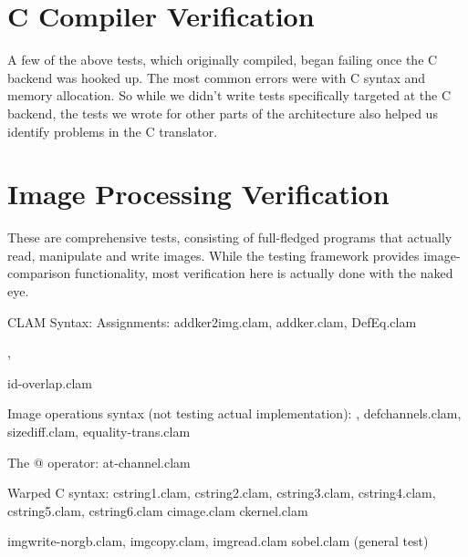 \section{C Compiler Verification}
\label{test:ccompiler}

A few of the above tests, which originally compiled, began failing once the C backend was hooked up.
The most common errors were with C syntax and memory allocation.
So while we didn't write tests specifically targeted at the C backend,
the tests we wrote for other parts of the architecture also helped us identify problems in the C translator. 

\section{Image Processing Verification}
\label{test:output}

These are comprehensive tests, consisting of full-fledged programs that actually
read, manipulate and write images. While the testing framework provides image-comparison functionality,
most verification here is actually done with the naked eye.


CLAM Syntax:
	Assignments: 
		addker2img.clam, addker.clam, DefEq.clam


, 

id-overlap.clam

	Image operations syntax (not testing actual implementation):
		, 
		defchannels.clam, sizediff.clam, equality-trans.clam

	The @ operator: at-channel.clam


Warped C syntax:
	cstring1.clam, cstring2.clam, cstring3.clam, cstring4.clam, cstring5.clam, cstring6.clam
	cimage.clam
	ckernel.clam

	imgwrite-norgb.clam,  imgcopy.clam,  imgread.clam
	sobel.clam (general test)
